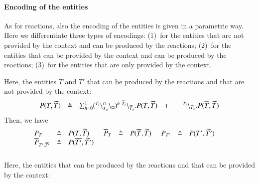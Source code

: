 \paragraph{Encoding of the entities}

As for reactions, also the encoding of the entities is given in a parametric way.
Here we differentiate three types of encodings: (1)~for the entities that are not  provided by the context and  can be produced by the reactions; (2)~for the entities that can be provided by the context and can be  produced by the reactions; (3)~for the entities that are only provided by the context.

Here, the entities $T$ and $T'$ that can be produced by the reactions and that are not provided by the context:
\[
\begin{array}{lcllcl}
P (T,\widetilde{T})&\triangleq & \sum_{h=0}^1 ({}^{T_i}\backslash_{T_o}^{\scriptstyle {\square}}\backslash_{\scriptstyle {\square}})^h\ {}^{\widetilde{T}_i} \backslash_{\widetilde{T}_o}.P (T,\widetilde{T})
& +  && {}^{T_i} \backslash_{T_o}.P (\overline{T},\widetilde{T}) \\
\end{array}
\]
Then, we have
\[
\begin{array}{lcl @{\hspace{0.5cm}}lcl @{\hspace{0.5cm}}lcl @{\hspace{0.5cm}}lcl}
P_T & \defeq & P(T,\widetilde{T})& \overline{P}_T & \defeq & P(\overline{T},\widetilde{T}) & P_{T'}& \defeq & P(T',\widetilde{T'}) & \\
\overline{P}_{T',\widetilde{T'}}& \defeq & P(\overline{T'},\widetilde{T'})\\\
\end{array}
\]
Here, the entities that can be produced by the reactions and that can be  provided by the context:
